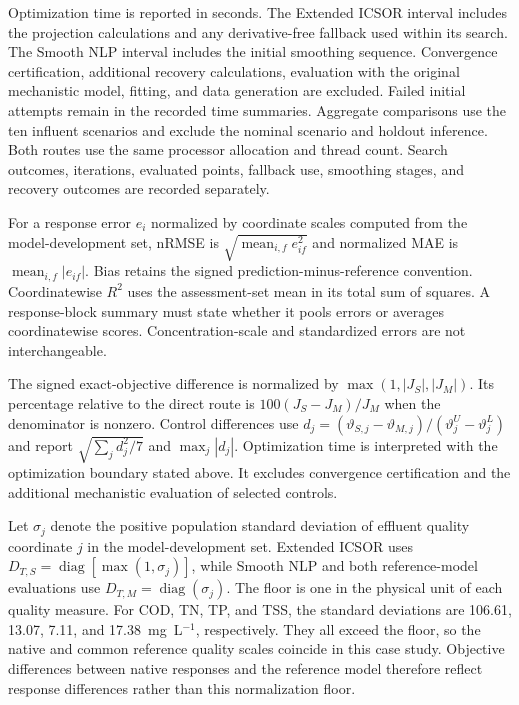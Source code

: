 \documentclass[a4paper,fleqn]{cas-sc}
\begin{document}
Optimization time is reported in seconds. The Extended ICSOR interval includes the projection calculations and any derivative-free fallback used within its search. The Smooth NLP interval includes the initial smoothing sequence. Convergence certification, additional recovery calculations, evaluation with the original mechanistic model, fitting, and data generation are excluded. Failed initial attempts remain in the recorded time summaries. Aggregate comparisons use the ten influent scenarios and exclude the nominal scenario and holdout inference. Both routes use the same processor allocation and thread count. Search outcomes, iterations, evaluated points, fallback use, smoothing stages, and recovery outcomes are recorded separately.

For a response error $e_i$ normalized by coordinate scales computed from the model-development set, nRMSE is $\sqrt{\operatorname{mean}_{i,f}e_{if}^2}$ and normalized MAE is $\operatorname{mean}_{i,f}|e_{if}|$. Bias retains the signed prediction-minus-reference convention. Coordinatewise $R^2$ uses the assessment-set mean in its total sum of squares. A response-block summary must state whether it pools errors or averages coordinatewise scores. Concentration-scale and standardized errors are not interchangeable.

The signed exact-objective difference is normalized by $\max(1,|J_S|,|J_M|)$. Its percentage relative to the direct route is $100(J_S-J_M)/J_M$ when the denominator is nonzero. Control differences use $d_j=(\vartheta_{S,j}-\vartheta_{M,j})/(\vartheta_j^U-\vartheta_j^L)$ and report $\sqrt{\sum_jd_j^2/7}$ and $\max_j|d_j|$. Optimization time is interpreted with the optimization boundary stated above. It excludes convergence certification and the additional mechanistic evaluation of selected controls.

Let $\sigma_j$ denote the positive population standard deviation of effluent quality coordinate $j$ in the model-development set. Extended ICSOR uses $D_{T,S}=\operatorname{diag}[\max(1,\sigma_j)]$, while Smooth NLP and both reference-model evaluations use $D_{T,M}=\operatorname{diag}(\sigma_j)$. The floor is one in the physical unit of each quality measure. For COD, TN, TP, and TSS, the standard deviations are 106.61, 13.07, 7.11, and 17.38~mg~L$^{-1}$, respectively. They all exceed the floor, so the native and common reference quality scales coincide in this case study. Objective differences between native responses and the reference model therefore reflect response differences rather than this normalization floor.
\end{document}
